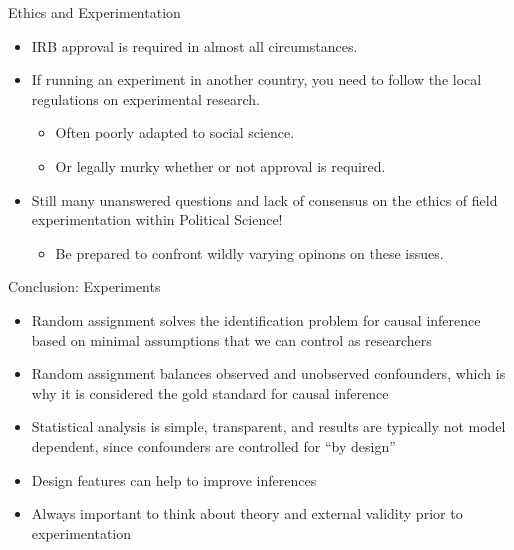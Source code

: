 \documentclass{beamer}
\numberwithin{equation}{section}
\begin{document}
\begin{frame}{Ethics and Experimentation}
\small
\begin{itemize}
\item
  IRB approval is required in almost all circumstances.\bigskip
\item
  If running an experiment in another country, you need to follow the
  local regulations on experimental research.

  \begin{itemize}
  \item
    Often poorly adapted to social science.
  \item
    Or legally murky whether or not approval is required.
  \end{itemize}\bigskip
\item
  Still many unanswered questions and lack of consensus on the ethics of
  field experimentation within Political Science!

  \begin{itemize}
  \itemsep1pt\parskip0pt
  \item
    Be prepared to confront wildly varying opinons on these issues.
  \end{itemize}
\end{itemize}

\end{frame}




\begin{frame}{Conclusion: Experiments}

\begin{itemize}

\item
  Random assignment solves the identification problem for causal
  inference based on minimal assumptions that we can control as researchers \medskip
\item
  Random assignment balances observed and unobserved confounders, which
  is why it is considered the gold standard for causal inference\medskip
\item
  Statistical analysis is simple, transparent, and results are typically not
  model dependent, since confounders are controlled for ``by design''\medskip
\item
  Design features can help to improve inferences\medskip
\item
  Always important to think about theory and external validity prior to
  experimentation\medskip
\end{itemize}

\end{frame}
\end{document}
